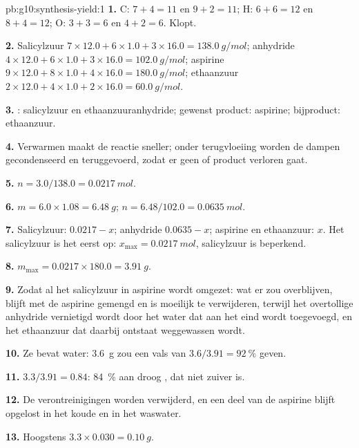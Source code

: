 \begin{solution}{pb:g10:synthesis-yield:1}
\textbf{1.} C: $7 + 4 = 11$ en $9 + 2 = 11$; H: $6 + 6 = 12$ en
$8 + 4 = 12$; O: $3 + 3 = 6$ en $4 + 2 = 6$. Klopt.

\textbf{2.} Salicylzuur $7 \times 12.0 + 6 \times 1.0 + 3 \times 16.0
= \qty{138.0}{g/mol}$; anhydride $4 \times 12.0 + 6 \times 1.0 +
3 \times 16.0 = \qty{102.0}{g/mol}$; aspirine $9 \times 12.0 + 8 \times
1.0 + 4 \times 16.0 = \qty{180.0}{g/mol}$; ethaanzuur $2 \times 12.0
+ 4 \times 1.0 + 2 \times 16.0 = \qty{60.0}{g/mol}$.

\textbf{3.} : salicylzuur en ethaanzuuranhydride; gewenst
product: aspirine; bijproduct: ethaanzuur.

\textbf{4.} Verwarmen maakt de reactie sneller; onder terugvloeiing
worden de dampen gecondenseerd en teruggevoerd, zodat er geen 
of product verloren gaat.

\textbf{5.} $n = 3.0 / 138.0 = \qty{0.0217}{mol}$.

\textbf{6.} $m = 6.0 \times 1.08 = \qty{6.48}{g}$;
$n = 6.48 / 102.0 = \qty{0.0635}{mol}$.

\textbf{7.} Salicylzuur: $0.0217 - x$; anhydride $0.0635 - x$;
aspirine en ethaanzuur: $x$. Het salicylzuur is het eerst op:
$x_{\max} = \qty{0.0217}{mol}$, salicylzuur is beperkend.

\textbf{8.} $m_{\max} = 0.0217 \times 180.0 = \qty{3.91}{g}$.

\textbf{9.} Zodat al het salicylzuur in aspirine wordt omgezet: wat er
zou overblijven, blijft met de aspirine gemengd en is moeilijk te
verwijderen, terwijl het overtollige anhydride vernietigd wordt door het
water dat aan het eind wordt toegevoegd, en het ethaanzuur dat daarbij
ontstaat weggewassen wordt.

\textbf{10.} Ze bevat water: \qty{3.6}{g} zou een vals  van
$3.6 / 3.91 = \qty{92}{\percent}$ geven.

\textbf{11.} $3.3 / 3.91 = 0.84$: \qty{84}{\percent} aan droog , dat niet zuiver is.

\textbf{12.} De verontreinigingen worden verwijderd, en een deel van de
aspirine blijft opgelost in het koude  en in het waswater.

\textbf{13.} Hoogstens $3.3 \times 0.030 = \qty{0.10}{g}$.


\end{solution}
